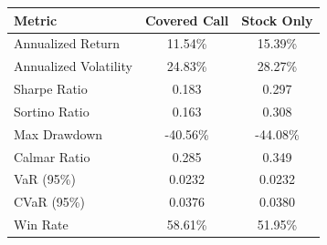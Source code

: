 \begin{tabular}{lcc}
    \toprule
    \textbf{Metric} & \textbf{Covered Call} & \textbf{Stock Only} \\
    \midrule
    Annualized Return & 11.54\% & 15.39\% \\
    Annualized Volatility & 24.83\% & 28.27\% \\
    Sharpe Ratio & 0.183 & 0.297 \\
    Sortino Ratio & 0.163 & 0.308 \\
    Max Drawdown & -40.56\% & -44.08\% \\
    Calmar Ratio & 0.285 & 0.349 \\
    VaR (95\%) & 0.0232 & 0.0232 \\
    CVaR (95\%) & 0.0376 & 0.0380 \\
    Win Rate & 58.61\% & 51.95\% \\
    \bottomrule
\end{tabular}
